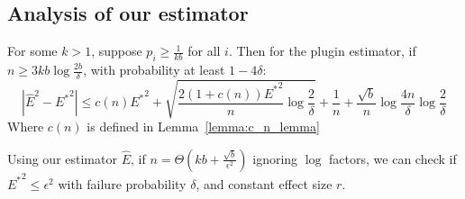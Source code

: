 \subsection{Analysis of our estimator}

\begin{theorem}
\label{thm:our-bound}
For some $k > 1$, suppose $p_i \geq \frac{1}{kb}$ for all $i$. Then for the plugin estimator, if $n \geq 3kb \log{\frac{2b}{\delta}}$, with probability at least $1 - 4\delta$:
\[ | \hat{E}^2 - {E^*}^2 | \leq c(n){E^*}^2 + \sqrt{\frac{2(1+c(n)){E^*}^2}{n} \log{\frac{2}{\delta}}} + \frac{1}{n} + \frac{\sqrt{b}}{n}\log{\frac{4n}{\delta}} \log{\frac{2}{\delta}}\]
Where $c(n)$ is defined in Lemma~\ref{lemma:c_n_lemma}
\end{theorem}

\begin{theorem}
\label{thm:final-ours}
Using our estimator $\hat{E}$, if $n = \Theta(kb + \frac{\sqrt{b}}{\epsilon^2})$ ignoring $\log$ factors, we can check if ${E^*}^2  \leq \epsilon^2$ with failure probability $\delta$, and constant effect size $r$. 
\end{theorem}


